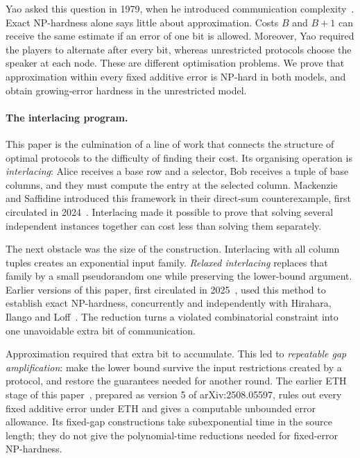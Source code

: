 \documentclass[11pt]{article} \usepackage[utf8]{inputenc}
\theoremstyle{plain} \newtheorem{theorem}{Theorem}[section]
\theoremstyle{definition} \newaliascnt{definition}{theorem}
\begin{document}
Yao asked this question in 1979, when he introduced communication
complexity~\cite{yao1979distributed}. Exact NP-hardness alone says little
about approximation. Costs $B$ and $B+1$ can receive
the same estimate if an error of one bit is allowed. Moreover, Yao required
the players to alternate after every bit, whereas unrestricted protocols
choose the speaker at each node. These are different optimisation problems.
We prove that approximation within every fixed additive error is NP-hard
in both models, and obtain growing-error hardness in the unrestricted model.

\paragraph{The interlacing program.}
This paper is the culmination of a line of work that connects the structure
of optimal protocols to the difficulty of finding their cost. Its organising
operation is \emph{interlacing}: Alice receives a base row and a selector,
Bob receives a tuple of base columns, and they must compute the entry at
the selected column. Mackenzie and Saffidine introduced this framework in
their direct-sum counterexample, first circulated in
2024~\cite{mackenzie2025refuting}. Interlacing made it possible to prove
that solving several independent instances together can cost less than
solving them separately.

The next obstacle was the size of the construction. Interlacing with all
column tuples creates an exponential input family. \emph{Relaxed
interlacing} replaces that family by a small pseudorandom one while
preserving the lower-bound argument. Earlier versions of this paper,
first circulated in 2025~\cite{gaspers-he-mackenzie-npcc}, used this method
to establish exact NP-hardness, concurrently and independently with
Hirahara, Ilango and Loff~\cite{hirahara2025communication}. The reduction
turns a violated combinatorial constraint into one unavoidable extra bit of
communication.

Approximation required that extra bit to accumulate. This led to
\emph{repeatable gap amplification}: make the lower bound survive the
input restrictions created by a protocol, and restore the guarantees
needed for another round. The earlier ETH stage of this
paper~\cite{gaspers2026interlacingeth}, prepared as version 5 of
arXiv:2508.05597, rules out every fixed additive error under ETH and gives
a computable unbounded error allowance. Its fixed-gap constructions take
subexponential time in the source length; they do not give the
polynomial-time reductions needed for fixed-error NP-hardness.
\end{document}

